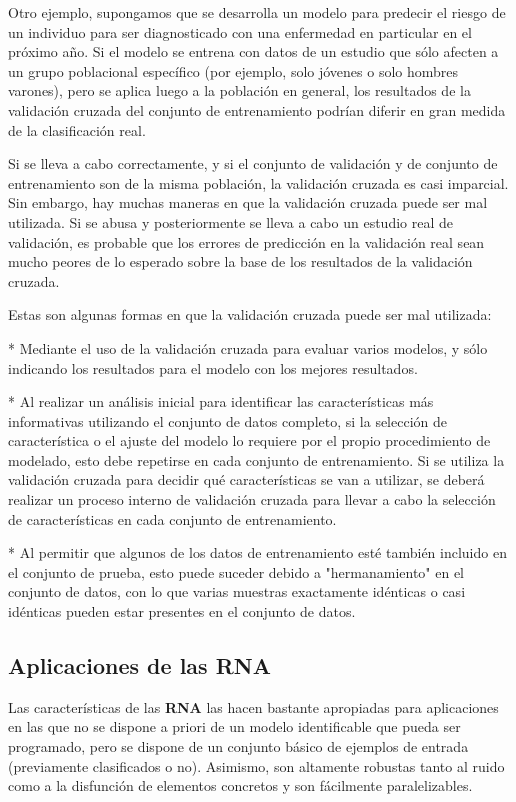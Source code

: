 \documentclass[10pt,a4paper]{article}
\begin{document}
Otro ejemplo, supongamos que se desarrolla un modelo para predecir el riesgo de un individuo para ser diagnosticado con una enfermedad en particular en el próximo año. Si el modelo se entrena con datos de un estudio que sólo afecten a un grupo poblacional específico (por ejemplo, solo jóvenes o solo hombres varones), pero se aplica luego a la población en general, los resultados de la validación cruzada del conjunto de entrenamiento podrían diferir en gran medida de la clasificación real.

Si se lleva a cabo correctamente, y si el conjunto de validación y de conjunto de entrenamiento son de la misma población, la validación cruzada es casi imparcial. Sin embargo, hay muchas maneras en que la validación cruzada puede ser mal utilizada. Si se abusa y posteriormente se lleva a cabo un estudio real de validación, es probable que los errores de predicción en la validación real sean mucho peores de lo esperado sobre la base de los resultados de la validación cruzada.

Estas son algunas formas en que la validación cruzada puede ser mal utilizada:

* Mediante el uso de la validación cruzada para evaluar varios modelos, y sólo indicando los resultados para el modelo con los mejores resultados.

* Al realizar un análisis inicial para identificar las características más informativas utilizando el conjunto de datos completo, si la selección de característica o el ajuste del modelo lo requiere por el propio procedimiento de modelado, esto debe repetirse en cada conjunto de entrenamiento. Si se utiliza la validación cruzada para decidir qué características se van a utilizar, se deberá realizar un proceso interno de validación cruzada para llevar a cabo la selección de características en cada conjunto de entrenamiento.

* Al permitir que algunos de los datos de entrenamiento esté también incluido en el conjunto de prueba, esto puede suceder debido a "hermanamiento" en el conjunto de datos, con lo que varias muestras exactamente idénticas o casi idénticas pueden estar presentes en el conjunto de datos.

\subsection{Aplicaciones de las RNA}
Las características de las \textbf{RNA} las hacen bastante apropiadas para aplicaciones en las que no se dispone a priori de un modelo identificable que pueda ser programado, pero se dispone de un conjunto básico de ejemplos de entrada (previamente clasificados o no). Asimismo, son altamente robustas tanto al ruido como a la disfunción de elementos concretos y son fácilmente paralelizables.
\end{document}
